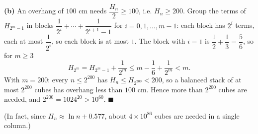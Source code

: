 \textbf{(b)} An overhang of $100$ cm needs $\dfrac{H_n}{2}\ge100$, i.e. $H_n\ge200$. Group the terms of $H_{2^m-1}$ in blocks $\dfrac1{2^i}+\cdots+\dfrac1{2^{i+1}-1}$ for $i=0,1,\dots,m-1$: each block has $2^i$ terms, each at most $\dfrac1{2^i}$, so each block is at most $1$. The block with $i=1$ is $\dfrac12+\dfrac13=\dfrac56$, so for $m\ge3$
\[H_{2^m}=H_{2^m-1}+\dfrac1{2^m}\le m-\dfrac16+\dfrac1{2^m}<m.\]
With $m=200$: every $n\le2^{200}$ has $H_n\le H_{2^{200}}<200$, so a balanced stack of at most $2^{200}$ cubes has overhang less than $100$ cm. Hence more than $2^{200}$ cubes are needed, and $2^{200}=1024^{20}>10^{60}$. $\blacksquare$

(In fact, since $H_n\approx\ln n+0.577$, about $4\times10^{86}$ cubes are needed in a single column.)
